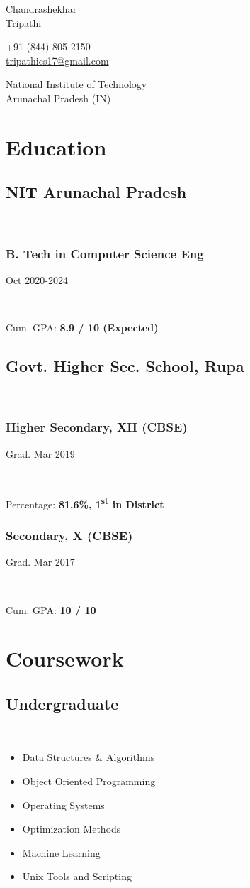 \documentclass[]{article}
\newcommand{\namesection}[3]{
  \begin{multicols}{2}
    \begin{flushleft}
      \fontsize{30pt}{25pt}
      \fontspec[Path = fonts/ZillaSlab/]{ZillaSlab-Light}
      {{ #1 }\\{ #2 }}
      \columnbreak\\
    \end{flushleft}
    \begin{flushright}
      { #3 }
    \end{flushright}
  \end{multicols}
  \vspace{-10pt}
}
\newcommand{\subheading}[2]{
  {\subsection{#1}
  \hfill{#2}}\\
  \vspace{2pt}
}
\newcommand{\subsubheading}[2]{
  {\subsubsection{#1}
  \hfill \small#2} \\
  \vspace{2pt}
}
\newenvironment{tightemize}{
\vspace{-\topsep}\begin{itemize}\itemsep1pt \parskip0pt \parsep0pt}
{\end{itemize}\vspace{-\topsep}}
\begin{document}
\namesection{Chandrashekhar}{Tripathi}{+91 (844) 805-2150\\
  \href{mailto:tripathics17@gmail.com}{tripathics17@gmail.com}
  \par
  National Institute of Technology\\
  Arunachal Pradesh (IN)}

\noindent\makebox[\linewidth]{\color{light}\rule{\paperwidth}{0.2pt}}
\vspace{-15pt}

    \section{Education}    
    \subheading{NIT Arunachal Pradesh}{}
    \subsubheading{B. Tech in Computer Science Eng}{Oct 2020-2024}
    Cum. GPA: \textbf{8.9 / 10 (Expected)}

    \subheading{Govt. Higher Sec. School, Rupa}{}
    \subsubheading{Higher Secondary, XII (CBSE)}{Grad. Mar 2019}
    Percentage: \textbf{81.6\%, 1\textsuperscript{st} in District}

    \subsubheading{Secondary, X (CBSE)}{Grad. Mar 2017}
    Cum. GPA: \textbf{10 / 10}
    
    
    \section{Coursework}
    \subheading{Undergraduate}{}
    \begin{tightemize}
      \item Data Structures \& Algorithms
      \item Object Oriented Programming
      \item Operating Systems
      \item Optimization Methods
      \item Machine Learning
      \item Unix Tools and Scripting
    \end{tightemize}
\end{document}
